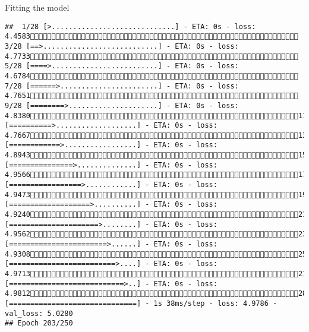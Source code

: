 \documentclass[
  ignorenonframetext,
]{beamer}
\begin{document}
\begin{frame}[fragile]{Fitting the model}
\begin{verbatim}
##  1/28 [>.............................] - ETA: 0s - loss: 4.4583 3/28 [==>...........................] - ETA: 0s - loss: 4.7733 5/28 [====>.........................] - ETA: 0s - loss: 4.6784 7/28 [======>.......................] - ETA: 0s - loss: 4.7651 9/28 [========>.....................] - ETA: 0s - loss: 4.838011/28 [==========>...................] - ETA: 0s - loss: 4.766713/28 [============>.................] - ETA: 0s - loss: 4.894315/28 [===============>..............] - ETA: 0s - loss: 4.956617/28 [=================>............] - ETA: 0s - loss: 4.947319/28 [===================>..........] - ETA: 0s - loss: 4.924021/28 [=====================>........] - ETA: 0s - loss: 4.956223/28 [=======================>......] - ETA: 0s - loss: 4.930825/28 [=========================>....] - ETA: 0s - loss: 4.971327/28 [===========================>..] - ETA: 0s - loss: 4.981228/28 [==============================] - 1s 38ms/step - loss: 4.9786 - val_loss: 5.0280
## Epoch 203/250

\end{verbatim}
\end{frame}
\end{document}
